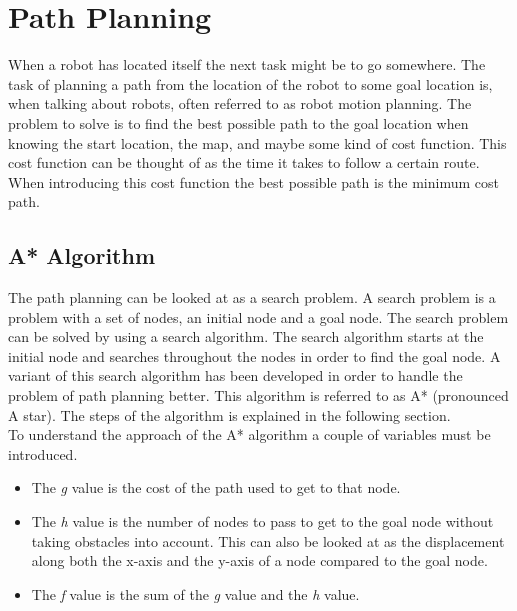 
\section{Path Planning} %
\label{sec:path_planning}

When a robot has located itself the next task might be to go somewhere. The task of planning a path from the location of the robot to some goal location is, when talking about robots, often referred to as robot motion planning. The problem to solve is to find the best possible path to the goal location when knowing the start location, the map, and maybe some kind of cost function. This cost function can be thought of as the time it takes to follow a certain route. When introducing this cost function the best possible path is the minimum cost path. \\

\subsection{A* Algorithm} %
\label{sub:a_algorithm}

The path planning can be looked at as a search problem. A search problem is a problem with a set of nodes, an initial node and a goal node. The search problem can be solved by using a search algorithm. The search algorithm starts at the initial node and searches throughout the nodes in order to find the goal node. A variant of this search algorithm has been developed in order to handle the problem of path planning better. This algorithm is referred to as A* (pronounced A star). The steps of the algorithm is explained in the following section. \\

To understand the approach of the A* algorithm a couple of variables must be introduced.

\begin{itemize}
	\item The \emph{g} value is the cost of the path used to get to that node.

	\item The \emph{h} value is the number of nodes to pass to get to the goal node without taking obstacles into account. This can also be looked at as the displacement along both the x-axis and the y-axis of a node compared to the goal node.

	\item The \emph{f} value is the sum of the \emph{g} value and the \emph{h} value.\\
\end{itemize}

